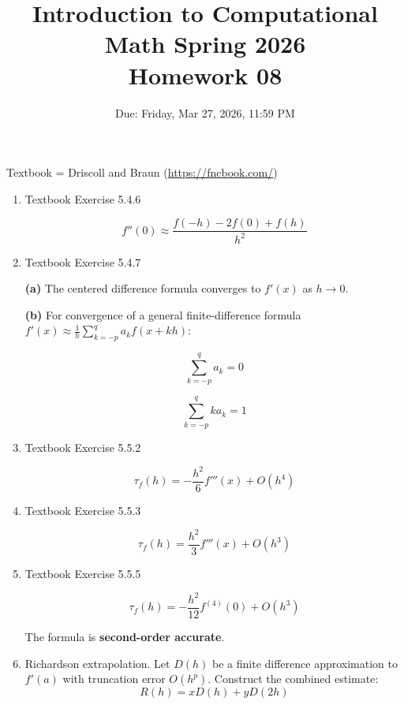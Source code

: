 \documentclass[reqno, answers]{exam}
\title{Introduction to Computational Math Spring 2026 \\ Homework 08}
\date{Due: Friday, Mar 27, 2026, 11:59 PM}
\author{}
\begin{document}
\maketitle
\thispagestyle{empty}

Textbook = Driscoll and Braun (\url{https://fncbook.com/})

\begin{enumerate}

\item Textbook Exercise 5.4.6

\begin{solution}
$$\boxed{f''(0) \approx \frac{f(-h) - 2f(0) + f(h)}{h^2}}$$
\end{solution}

\item Textbook Exercise 5.4.7
\begin{solution}
\textbf{(a)} The centered difference formula converges to $f'(x)$ as $h \to 0$.

\textbf{(b)} For convergence of a general finite-difference formula $f'(x) \approx \frac{1}{h}\sum_{k=-p}^{q} a_k f(x+kh)$:

$$\boxed{\sum_{k=-p}^{q} a_k = 0}$$

$$\boxed{\sum_{k=-p}^{q} k a_k = 1}$$
\end{solution}

\item Textbook Exercise 5.5.2

\begin{solution}
$$\boxed{\tau_f(h) = -\frac{h^2}{6}f'''(x) + O(h^4)}$$
\end{solution}

\item Textbook Exercise 5.5.3
\begin{solution}
$$\boxed{\tau_f(h) = \frac{h^2}{3}f'''(x) + O(h^3)}$$
\end{solution}

\item Textbook Exercise 5.5.5

\begin{solution}
$$\boxed{\tau_f(h) = -\frac{h^2}{12}f^{(4)}(0) + O(h^3)}$$

The formula is \textbf{second-order accurate}.
\end{solution}

\item Richardson extrapolation. Let $D(h)$ be a finite difference approximation to $f'(a)$ with truncation error $O(h^p)$. Construct the combined estimate:
\[
R(h) = x D(h) + y D(2h)
\]


\end{enumerate}
\end{document}
